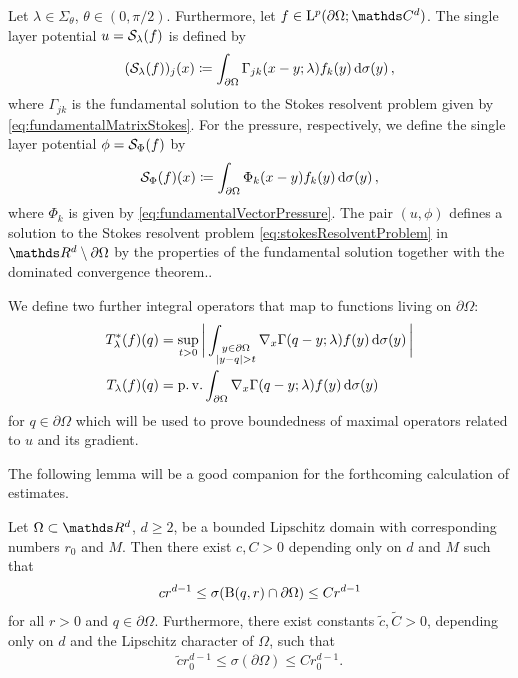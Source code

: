 Let $\lambda \in \Sigma_\theta$, $\theta \in (0,\pi/2)$. 
Furthermore, let $f \in \Ell^p(\partial\Omega; \C^d)$. 
The single layer potential $u = \mathcal{S}_\lambda(f)$ is defined by
\begin{align}
  \label{eq:defSingleLayer}
  (\mathcal{S}_\lambda(f))_j(x) 
  \coloneqq \int_{\partial\Omega} \Gamma_{jk}(x - y; \lambda) f_k(y) \, {\operatorname{d}\!{\sigma}}(y)\,,
\end{align}
where $\Gamma_{jk}$ is the fundamental solution to the Stokes resolvent problem given by \eqref{eq:fundamentalMatrixStokes}.
For the pressure, respectively, we define the single layer potential $\phi = \mathcal{S}_\Phi(f)$ by
\begin{align}
  \label{eq:defSingleLayerPressure}
  \mathcal{S}_{\Phi}(f)(x) \coloneqq \int_{\partial\Omega} \Phi_k(x - y) f_k(y) \, {\operatorname{d}\!{\sigma}}(y)\,,
\end{align}
where $\Phi_k$ is given by \eqref{eq:fundamentalVectorPressure}.
The pair $(u,\phi)$ defines a solution to the Stokes resolvent problem \eqref{eq:stokesResolventProblem} in $\R^d \setminus \partial\Omega$ by the properties of the fundamental solution together with the dominated convergence theorem..

We define two further integral operators that map to functions living on $\partial\Omega$:
\begin{align}
  T_\lambda^*(f)(q) &= \sup_{t > 0} \bigg| \int_{\substack{y \in \partial\Omega \\ |y - q| > t}} \nabla_x \Gamma(q - y; \lambda) f(y) \, {\operatorname{d}\!{\sigma}}(y) \, \bigg| \label{eq:supTOperator}\\
  T_\lambda(f)(q) &= \operatorname{p. v.} \int_{\partial\Omega} \nabla_x \Gamma(q - y; \lambda) f(y) \, {\operatorname{d}\!{\sigma}}(y) \label{eq:pvTOperator}
\end{align}
for $q \in \partial\Omega$ which will be used to prove boundedness of maximal operators related to $u$ and its gradient.

The following lemma will be a good companion for the forthcoming calculation of estimates.
\begin{lem}
  \label{lem:compareBoundaryWithBall}
  Let $\Omega \subset \R^d$, $d \geq 2$, be a bounded Lipschitz domain with corresponding numbers $r_0$ and $M$.
  Then there exist $c, C > 0$ depending only on $d$ and $M$ such that
  \begin{align*}
    c r^{d - 1} 
    \leq \sigma(\mathrm{B}(q,r) \cap \partial\Omega) \leq C r^{d -1}
  \end{align*}
  for all $r > 0$ and $q \in \partial\Omega$.
  Furthermore, there exist constants $\tilde c, \tilde C > 0$, depending only on $d$ and the Lipschitz character of $\Omega$, such that
  \begin{align*}
    \tilde c r_0^{d - 1} 
    \leq \sigma(\partial\Omega) 
    \leq C r_0^{d - 1}.
\end{align*}
\end{lem}

